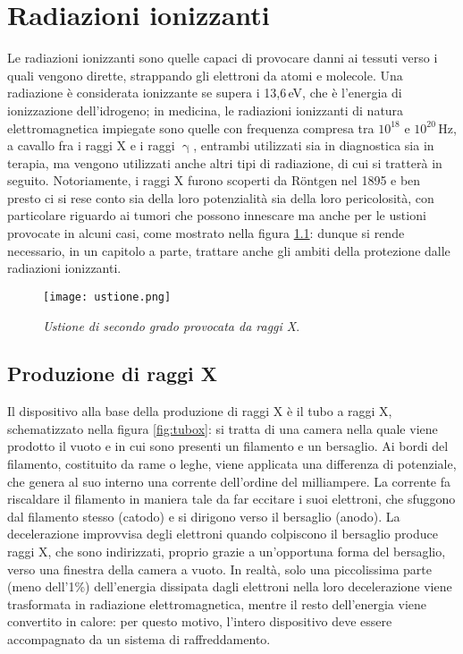 \documentclass{report}
\newcommand{\figref}[1]{figura \ref{#1}}
\numberwithin{equation}{section}
\numberwithin{figure}{section}
\begin{document}
\chapter{Radiazioni ionizzanti}

Le radiazioni ionizzanti sono quelle capaci di provocare danni ai tessuti verso i quali vengono dirette, strappando gli elettroni da atomi e molecole. Una radiazione è considerata ionizzante se supera i 13,6\,eV, che è l'energia di ionizzazione dell'idrogeno; in medicina, le radiazioni ionizzanti di natura elettromagnetica impiegate sono quelle con frequenza compresa tra $10^{18}$ e $10^{20}$\,Hz, a cavallo fra i raggi X e i raggi $\upgamma$, entrambi utilizzati sia in diagnostica sia in terapia, ma vengono utilizzati anche altri tipi di radiazione, di cui si tratterà in seguito. Notoriamente, i raggi X furono scoperti da Röntgen nel 1895 e ben presto ci si rese conto sia della loro potenzialità sia della loro pericolosità, con particolare riguardo ai tumori che possono innescare ma anche per le ustioni provocate in alcuni casi, come mostrato nella \figref{fig:ustione}: dunque si rende necessario, in un capitolo a parte, trattare anche gli ambiti della protezione dalle radiazioni ionizzanti.

\begin{figure}[htp]
\centering
\texttt{[image: ustione.png]}
\caption{\label{fig:ustione} \textit{Ustione di secondo grado provocata da raggi X}.}
\end{figure}

\section{Produzione di raggi X}
Il dispositivo alla base della produzione di raggi X è il tubo a raggi X, schematizzato nella \figref{fig:tubox}: si tratta di una camera nella quale viene prodotto il vuoto e in cui sono presenti un filamento e un bersaglio. Ai bordi del filamento, costituito da rame o leghe, viene applicata una differenza di potenziale, che genera al suo interno una corrente dell'ordine del milliampere. La corrente fa riscaldare il filamento in maniera tale da far eccitare i suoi elettroni, che sfuggono dal filamento stesso (catodo) e si dirigono verso il bersaglio (anodo). La decelerazione improvvisa degli elettroni quando colpiscono il bersaglio produce raggi X, che sono indirizzati, proprio grazie a un'opportuna forma del bersaglio, verso una finestra della camera a vuoto. In realtà, solo una piccolissima parte (meno dell'1\%) dell'energia dissipata dagli elettroni nella loro decelerazione viene trasformata in radiazione elettromagnetica, mentre il resto dell'energia viene convertito in calore: per questo motivo, l'intero dispositivo deve essere accompagnato da un sistema di raffreddamento.
\end{document}
